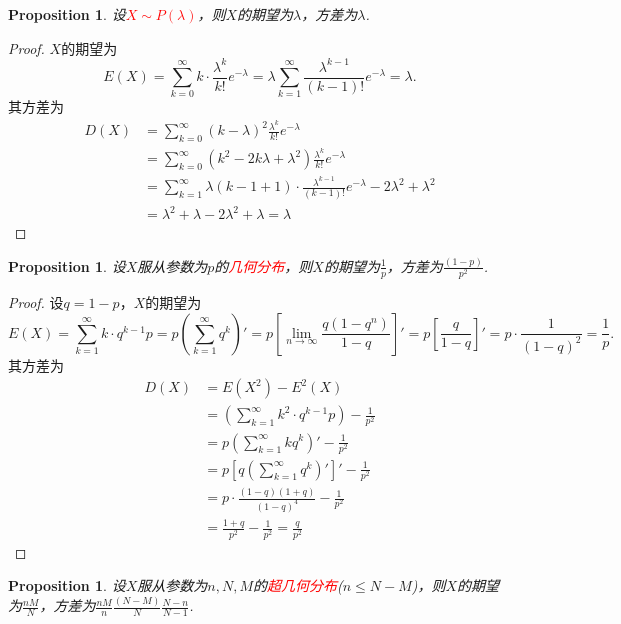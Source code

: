 \documentclass{article}
\newtheorem{proposition}[theorem]{Proposition}
\newcommand{\redt}[1]{\textcolor{red}{#1}}
\begin{document}
\begin{proposition}
\rm 设\redt{$X \sim P(\lambda)$}，则$X$的期望为$\lambda$，方差为$\lambda$.
\end{proposition}

\begin{proof}
$X$的期望为
$$
E(X) = \sum\limits_{k=0}^{\infty} k\cdot \frac{\lambda ^k}{k!}e^{-\lambda} =  \lambda \sum\limits_{k=1}^{\infty}  \frac{\lambda ^{k-1}}{(k-1)!}e^{-\lambda} = \lambda.
$$
其方差为
$$
\begin{array}{ll}
D(X) &= \sum\limits_{k=0}^{\infty} (k-\lambda)^2 \frac{\lambda ^k}{k!}e^{-\lambda} \\ 
&= \sum\limits_{k=0}^{\infty} (k^2 - 2k\lambda + \lambda^2) \frac{\lambda ^k}{k!}e^{-\lambda} \\ 
&= \sum\limits_{k=1}^{\infty} \lambda (k-1+1) \cdot \frac{\lambda ^{k-1}}{(k-1)!}e^{-\lambda}  - 2\lambda^2 +\lambda^2\\
&= \lambda^2 + \lambda - 2\lambda^2 + \lambda = \lambda
\end{array}
$$
\end{proof}

\begin{proposition}
\rm 设$X$服从参数为$p$的\redt{几何分布}，则$X$的期望为$\frac{1}{p}$，方差为$\frac{(1-p)}{p^2}$.
\end{proposition}

\begin{proof}
设$q= 1- p$，$X$的期望为
$$
E(X) = \sum\limits_{k=1}^\infty k \cdot q^{k-1}p = p(\sum\limits_{k=1}^\infty q^{k})' = p \left[\lim\limits_{n \to \infty}\frac{q(1-q^n)}{1-q} \right]' = p\left[\frac{q}{1-q}\right]' = p \cdot \frac{1}{(1-q)^2} = \frac{1}{p}. 
$$
其方差为
$$
\begin{array}{ll}
D(X) &= E(X^2)-E^2(X) \\
&= \left(\sum\limits_{k=1}^\infty k^2 \cdot q^{k-1}p \right) -\frac{1}{p^2} \\
&= p\left(\sum\limits_{k=1}^{\infty} kq^k\right)' - \frac{1}{p^2} \\
&= p\left[ q \left(\sum\limits_{k=1}^{\infty} q^k \right)'\right]' -\frac{1}{p^2}\\
&= p \cdot \frac{(1-q)(1+q)}{(1-q)^4} - \frac{1}{p^2} \\
&= \frac{1+q}{p^2} - \frac{1}{p^2} = \frac{q}{p^2}
\end{array}
$$
\end{proof}

\begin{proposition}
\rm 设$X$服从参数为$n,N,M$的\redt{超几何分布}($n \leq N-M$)，则$X$的期望为$\frac{nM}{N}$，方差为$\frac{nM}{n} \frac{(N-M)}{N} \frac{N-n}{N-1}$. 
\end{proposition}
\end{document}
